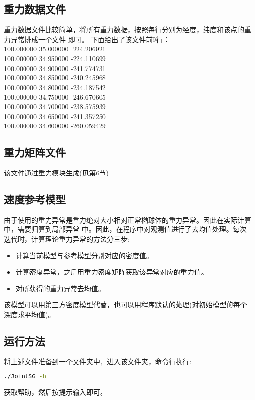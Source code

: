 \documentclass[10p,UTF8]{ctexart}
\begin{document}
    \subsection{重力数据文件}
    重力数据文件比较简单，将所有重力数据，按照每行分别为经度，纬度和该点的重力异常排成一个文件
    即可。
    下面给出了该文件前9行：\\
    100.000000 35.000000 -224.206921\\
    100.000000 34.950000 -224.110699\\
    100.000000 34.900000 -241.774731\\
    100.000000 34.850000 -240.245968\\
    100.000000 34.800000 -234.187542\\
    100.000000 34.750000 -246.670605\\
    100.000000 34.700000 -238.575939\\
    100.000000 34.650000 -241.357250\\
    100.000000 34.600000 -260.059429\\

    \subsection{重力矩阵文件}
    该文件通过重力模块生成(见第6节)

    \subsection{速度参考模型}
    由于使用的重力异常是重力绝对大小相对正常椭球体的重力异常。因此在实际计算中，需要归算到局部异常
    中。因此，在程序中对观测值进行了去均值处理。每次迭代时，计算理论重力异常的方法分三步:
    \begin{itemize}
        \item 计算当前模型与参考模型分别对应的密度值。
        \item 计算密度异常，之后用重力密度矩阵获取该异常对应的重力值。
        \item 对所获得的重力异常去均值。
    \end{itemize}
    该模型可以用第三方密度模型代替，也可以用程序默认的处理(对初始模型的每个深度求平均值)。

    \subsection{运行方法}
    将上述文件准备到一个文件夹中，进入该文件夹，命令行执行:
    \begin{lstlisting}[language=bash]
     ./JointSG -h
    \end{lstlisting}
    获取帮助，然后按提示输入即可。
\end{document}
